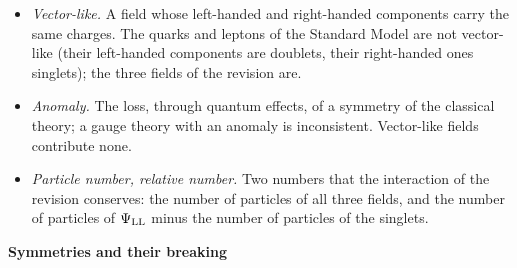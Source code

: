 \documentclass[
  10pt,
]{article}
\begin{document}
\begin{itemize}
  the \emph{hypercharge}, which says how strongly a field couples to the
  gauge field \(B_\mu\). The \emph{electric charge} is \(Q=T^3+Y\) (the
  rule of Gell-Mann and Nishijima).
\item
  \emph{Vector-like.} A field whose left-handed and right-handed
  components carry the same charges. The quarks and leptons of the
  Standard Model are not vector-like (their left-handed components are
  doublets, their right-handed ones singlets); the three fields of the
  revision are.
\item
  \emph{Anomaly.} The loss, through quantum effects, of a symmetry of
  the classical theory; a gauge theory with an anomaly is inconsistent.
  Vector-like fields contribute none.
\item
  \emph{Particle number, relative number.} Two numbers that the
  interaction of the revision conserves: the number of particles of all
  three fields, and the number of particles of \(\Psi_{\rm LL}\) minus
  the number of particles of the singlets.
\end{itemize}

\textbf{Symmetries and their breaking}
\end{document}
